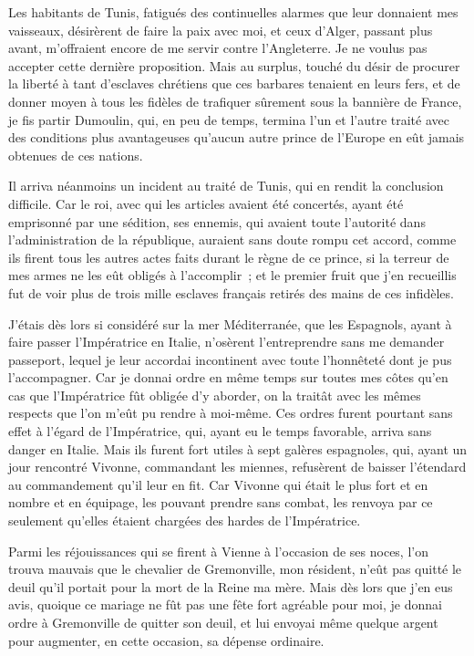 \documentclass[french,twoside]{book} %
\begin{document}
Les habitants de Tunis, fatigués des continuelles alarmes que leur donnaient mes vaisseaux, désirèrent de faire la paix avec moi, et ceux d’Alger, passant plus avant, m’offraient encore de me servir contre l’Angleterre. Je ne voulus pas accepter cette dernière proposition. Mais au surplus, touché du désir de procurer la liberté à tant d’esclaves chrétiens que ces barbares tenaient en leurs fers, et de donner moyen à tous les fidèles de trafiquer sûrement sous la bannière de France, je fis partir Dumoulin, qui, en peu de temps, termina l’un et l’autre traité avec des conditions plus avantageuses qu’aucun autre prince de l’Europe en eût jamais obtenues de ces nations.\par
Il arriva néanmoins un incident au traité de Tunis, qui en rendit la conclusion difficile. Car le roi, avec qui les articles avaient été concertés, ayant été emprisonné par une sédition, ses ennemis, qui avaient toute l’autorité dans l’administration de la république, auraient sans doute rompu cet accord, comme ils firent tous les autres actes faits durant le règne de ce prince, si la terreur de mes armes ne les eût obligés à l’accomplir ; et le premier fruit que j’en recueillis fut de voir plus de trois mille esclaves français retirés des mains de ces infidèles.\par
J’étais dès lors si considéré sur la mer Méditerranée, que les Espagnols, ayant à faire passer l’Impératrice en Italie, n’osèrent l’entreprendre sans me demander passeport, lequel je leur accordai incontinent avec toute l’honnêteté dont je pus l’accompagner. Car je donnai ordre en même temps sur toutes mes côtes qu’en cas que l’Impératrice fût obligée d’y aborder, on la traitât avec les mêmes respects que l’on m’eût pu rendre à moi-même. Ces ordres furent pourtant sans effet à l’égard de l’Impératrice, qui, ayant eu le temps favorable, arriva sans danger en Italie. Mais ils furent fort utiles à sept galères espagnoles, qui, ayant un jour rencontré Vivonne, commandant les miennes, refusèrent de baisser l’étendard au commandement qu’il leur en fit. Car Vivonne qui était le plus fort et en nombre et en équipage, les pouvant prendre sans combat, les renvoya par ce seulement qu’elles étaient chargées des hardes de l’Impératrice.\par
Parmi les réjouissances qui se firent à Vienne à l’occasion de ses noces, l’on trouva mauvais que le chevalier de Gremonville, mon résident, n’eût pas quitté le deuil qu’il portait pour la mort de la Reine ma mère. Mais dès lors que j’en eus avis, quoique ce mariage ne fût pas une fête fort agréable pour moi, je donnai ordre à Gremonville de quitter son deuil, et lui envoyai même quelque argent pour augmenter, en cette occasion, sa dépense ordinaire.\par
\end{document}
